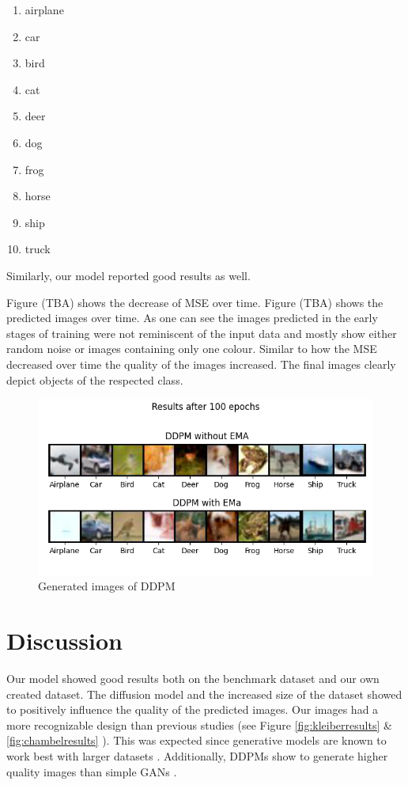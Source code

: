 \documentclass[12pt]{article}
\theoremstyle{plain}
\theoremstyle{definition}
\theoremstyle{remark}
\begin{document}
\begin{multicols}{4}
	\begin{enumerate}[itemsep=2pt,parsep=2pt]
		\item airplane
		\item car
		\item bird
		\item cat
		\item deer
		\item dog
		\item frog 
		\item horse
		\item ship
		\item truck
	\end{enumerate}
\end{multicols}

Similarly, our model reported good results as well. 

Figure (TBA) shows the decrease of \ac{MSE} over time. 
Figure (TBA) shows the predicted images over time. As one can see the images predicted in the early stages of training were not reminiscent of the input data and mostly show either random noise or images containing only one colour. Similar to how the \ac{MSE} decreased over time the quality of the images increased. The final images clearly depict objects of the respected class. 

\begin{figure}[h]
	\centering
	\includegraphics[width=1\linewidth]{src/Images/cifar10_results}
	\caption[Generated images of \ac{DDPM}]{Generated images of \ac{DDPM}}
\label{fig:cifar10results}
\end{figure}

\section{Discussion}
\label{sec:discussion}
Our model showed good results both on the benchmark dataset and our own created dataset. The diffusion model and the increased size of the dataset showed to positively influence the quality of the predicted images. Our images had a more recognizable design than previous studies (see Figure \ref{fig:kleiberresults} \& \ref{fig:chambelresults} ). This was expected since generative models are known to work best with larger datasets \citep{Yang2023}. Additionally, \ac{DDPM}s show to generate higher quality images than simple \ac{GAN}s \citep{Guarnera2023}.
\end{document}
